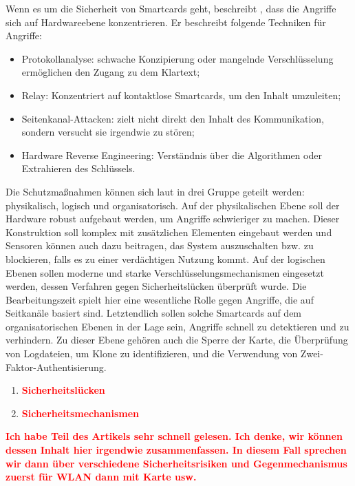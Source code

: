 Wenn es um die Sicherheit von Smartcards geht, beschreibt \cite{refmas:ASSS}, dass die Angriffe sich auf 
Hardwareebene konzentrieren. Er beschreibt folgende Techniken für Angriffe:

\begin{itemize}
    \item Protokollanalyse: schwache Konzipierung oder mangelnde Verschlüsselung ermöglichen den Zugang 
    zu dem Klartext; 
    \item Relay: Konzentriert auf kontaktlose Smartcards, um den Inhalt umzuleiten;
    \item Seitenkanal-Attacken: zielt nicht direkt den Inhalt des Kommunikation, sondern versucht sie
    irgendwie zu stören;
    \item Hardware Reverse Engineering: Verständnis über die Algorithmen oder Extrahieren des Schlüssels.
\end{itemize}


Die Schutzmaßnahmen können sich laut \cite{refmas:ASSS} in drei Gruppe geteilt werden: physikalisch,
logisch und organisatorisch. Auf der physikalischen Ebene soll der Hardware robust aufgebaut werden,
um Angriffe schwieriger zu machen. Dieser Konstruktion soll komplex mit zusätzlichen Elementen eingebaut
werden und Sensoren können auch dazu beitragen, das System auszuschalten bzw. zu blockieren, falls es zu 
einer verdächtigen Nutzung kommt. Auf der logischen Ebenen sollen moderne und starke Verschlüsselungsmechanismen
eingesetzt werden, dessen Verfahren gegen Sicherheitslücken überprüft wurde. Die Bearbeitungszeit spielt hier
eine wesentliche Rolle gegen Angriffe, die auf Seitkanäle basiert sind. Letztendlich sollen solche Smartcards
auf dem organisatorischen Ebenen in der Lage sein, Angriffe schnell zu detektieren und zu verhindern. Zu dieser
Ebene gehören auch die Sperre der Karte, die Überprüfung von Logdateien, um Klone zu identifizieren, und
die Verwendung von Zwei-Faktor-Authentisierung.



\begin{enumerate}
    \item \textbf{\textcolor{red}{Sicherheitslücken}}
    \item \textbf{\textcolor{red}{Sicherheitsmechanismen}}
\end{enumerate}

\textbf{\textcolor{red}{Ich habe Teil des Artikels sehr schnell gelesen. Ich denke, wir können dessen Inhalt hier
irgendwie zusammenfassen. In diesem Fall sprechen wir dann über verschiedene Sicherheitsrisiken und Gegenmechanismus
zuerst für WLAN dann mit Karte usw. \cite{refmas:ASSS}}}

